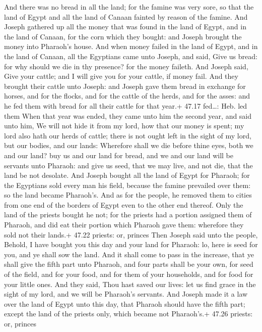  And there was no bread in all the land; for the famine
was very sore, so that the land of Egypt and all the land of Canaan
fainted by reason of the famine.  And Joseph gathered up
all the money that was found in the land of Egypt, and in the land of
Canaan, for the corn which they bought: and Joseph brought the money
into Pharaoh's house.  And when money failed in the land of
Egypt, and in the land of Canaan, all the Egyptians came unto Joseph,
and said, Give us bread: for why should we die in thy presence? for the
money faileth.  And Joseph said, Give your cattle; and I
will give you for your cattle, if money fail.  And they
brought their cattle unto Joseph: and Joseph gave them bread in exchange
for horses, and for the flocks, and for the cattle of the herds, and for
the asses: and he fed them with bread for all their cattle for that
year.+ 47.17 fed\ldots: Heb. led them  When that year was
ended, they came unto him the second year, and said unto him, We will
not hide it from my lord, how that our money is spent; my lord also hath
our herds of cattle; there is not ought left in the sight of my lord,
but our bodies, and our lands:  Wherefore shall we die
before thine eyes, both we and our land? buy us and our land for bread,
and we and our land will be servants unto Pharaoh: and give us seed,
that we may live, and not die, that the land be not desolate.
 And Joseph bought all the land of Egypt for Pharaoh; for
the Egyptians sold every man his field, because the famine prevailed
over them: so the land became Pharaoh's.  And as for the
people, he removed them to cities from one end of the borders of Egypt
even to the other end thereof.  Only the land of the
priests bought he not; for the priests had a portion assigned them of
Pharaoh, and did eat their portion which Pharaoh gave them: wherefore
they sold not their lands.+ 47.22 priests: or, princes 
Then Joseph said unto the people, Behold, I have bought you this day and
your land for Pharaoh: lo, here is seed for you, and ye shall sow the
land.  And it shall come to pass in the increase, that ye
shall give the fifth part unto Pharaoh, and four parts shall be your
own, for seed of the field, and for your food, and for them of your
households, and for food for your little ones.  And they
said, Thou hast saved our lives: let us find grace in the sight of my
lord, and we will be Pharaoh's servants.  And Joseph made
it a law over the land of Egypt unto this day, that Pharaoh should have
the fifth part; except the land of the priests only, which became not
Pharaoh's.+ 47.26 priests: or, princes

